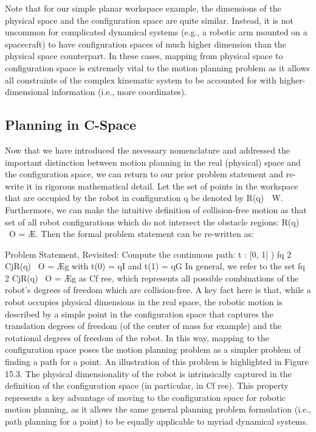\documentclass[twoside]{article}
\begin{document}
Note that for our simple planar workspace example, the dimensions of the physical space and the configuration space are quite similar. Instead, it is not uncommon for complicated dynamical systems (e.g., a robotic arm mounted on a spacecraft) to have configuration spaces of much higher dimension than the physical space counterpart. In these cases, mapping from physical space to configuration space is extremely
vital to the motion planning problem as it allows all constraints of the complex kinematic system to be accounted for with higher-dimensional information (i.e., more coordinates).

\subsection{ Planning in C-Space }
Now that we have introduced the necessary nomenclature and addressed the important distinction between motion planning in the real (physical) space and the configuration space, we can return to our prior problem statement and re-write it in rigorous mathematical detail. Let the set of points in the workspace that are occupied by the robot in configuration q be denoted by R(q)  W. Furthermore, we can make
the intuitive definition of collision-free motion as that set of all robot configurations which do not intersect the obstacle regions: R(q) \ O = Æ. Then the formal problem statement can be re-written as:

Problem Statement, Revisited:
Compute the continuous path: t : [0, 1] ) fq 2 CjR(q) \ O = Æg with t(0) = qI and t(1) = qG In general, we refer to the set fq 2 CjR(q) \ O = Æg as Cf ree, which represents all possible combinations of the robot’s degrees of freedom which are collision-free. A key fact here is that, while a robot occupies physical dimensions in the real space, the robotic motion is described by a simple point in the configuration space that captures the translation degrees of freedom (of the center of mass for example) and the rotational degrees of freedom of the robot. In this way, mapping to the configuration space poses the motion planning problem as a simpler problem of finding a path for a point. An illustration of this problem is highlighted in Figure 15.3. The physical dimensionality of the robot is intrinsically captured in the definition of the configuration space (in particular, in Cf ree). This property represents a key advantage
of moving to the configuration space for robotic motion planning, as it allows the same general planning problem formulation (i.e., path planning for a point) to be equally applicable to myriad dynamical systems.
\end{document}
